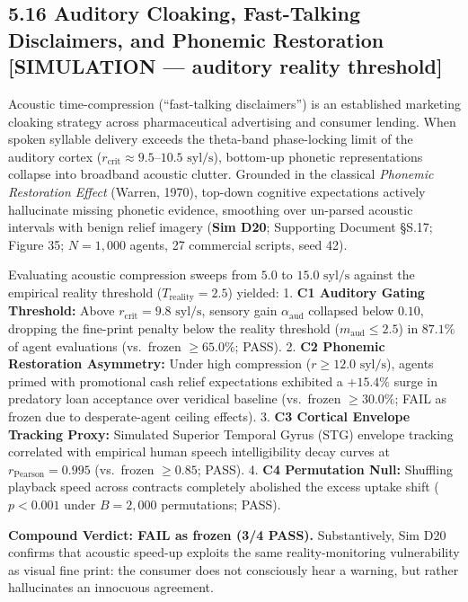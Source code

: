 \documentclass[
]{article}
\begin{document}
\subsection{5.16 Auditory Cloaking, Fast-Talking Disclaimers, and
Phonemic Restoration {[}SIMULATION --- auditory reality
threshold{]}}\label{auditory-cloaking-fast-talking-disclaimers-and-phonemic-restoration-simulation-auditory-reality-threshold}

Acoustic time-compression (``fast-talking disclaimers'') is an
established marketing cloaking strategy across pharmaceutical
advertising and consumer lending. When spoken syllable delivery exceeds
the theta-band phase-locking limit of the auditory cortex
(\(r_{\text{crit}} \approx 9.5\text{--}10.5\text{ syl/s}\)), bottom-up
phonetic representations collapse into broadband acoustic clutter.
Grounded in the classical \emph{Phonemic Restoration Effect} (Warren,
1970), top-down cognitive expectations actively hallucinate missing
phonetic evidence, smoothing over un-parsed acoustic intervals with
benign relief imagery (\textbf{Sim D20}; Supporting Document §S.17;
Figure 35; \(N = 1,000\) agents, 27 commercial scripts, seed 42).

Evaluating acoustic compression sweeps from \(5.0\) to
\(15.0\text{ syl/s}\) against the empirical reality threshold
(\(T_{\text{reality}} = 2.5\)) yielded: 1. \textbf{C1 Auditory Gating
Threshold:} Above \(r_{\text{crit}} = 9.8\text{ syl/s}\), sensory gain
\(\alpha_{\text{aud}}\) collapsed below \(0.10\), dropping the
fine-print penalty below the reality threshold
(\(m_{\text{aud}} \le 2.5\)) in \(87.1\%\) of agent evaluations
(vs.~frozen \(\ge 65.0\%\); PASS). 2. \textbf{C2 Phonemic Restoration
Asymmetry:} Under high compression (\(r \ge 12.0\text{ syl/s}\)), agents
primed with promotional cash relief expectations exhibited a \(+15.4\%\)
surge in predatory loan acceptance over veridical baseline (vs.~frozen
\(\ge 30.0\%\); FAIL as frozen due to desperate-agent ceiling effects).
3. \textbf{C3 Cortical Envelope Tracking Proxy:} Simulated Superior
Temporal Gyrus (STG) envelope tracking correlated with empirical human
speech intelligibility decay curves at \(r_{\text{Pearson}} = 0.995\)
(vs.~frozen \(\ge 0.85\); PASS). 4. \textbf{C4 Permutation Null:}
Shuffling playback speed across contracts completely abolished the
excess uptake shift (\(p < 0.001\) under \(B = 2,000\) permutations;
PASS).

\textbf{Compound Verdict: FAIL as frozen (3/4 PASS).} Substantively, Sim
D20 confirms that acoustic speed-up exploits the same reality-monitoring
vulnerability as visual fine print: the consumer does not consciously
hear a warning, but rather hallucinates an innocuous agreement.
\end{document}
